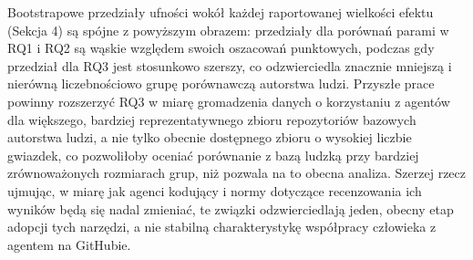 Bootstrapowe przedziały ufności wokół każdej raportowanej wielkości efektu (Sekcja 4) są spójne z powyższym obrazem: przedziały dla porównań parami w RQ1 i RQ2 są wąskie względem swoich oszacowań punktowych, podczas gdy przedział dla RQ3 jest stosunkowo szerszy, co odzwierciedla znacznie mniejszą i nierówną liczebnościowo grupę porównawczą autorstwa ludzi. Przyszłe prace powinny rozszerzyć RQ3 w miarę gromadzenia danych o korzystaniu z agentów dla większego, bardziej reprezentatywnego zbioru repozytoriów bazowych autorstwa ludzi, a nie tylko obecnie dostępnego zbioru o wysokiej liczbie gwiazdek, co pozwoliłoby oceniać porównanie z bazą ludzką przy bardziej zrównoważonych rozmiarach grup, niż pozwala na to obecna analiza. Szerzej rzecz ujmując, w miarę jak agenci kodujący i normy dotyczące recenzowania ich wyników będą się nadal zmieniać, te związki odzwierciedlają jeden, obecny etap adopcji tych narzędzi, a nie stabilną charakterystykę współpracy człowieka z agentem na GitHubie.